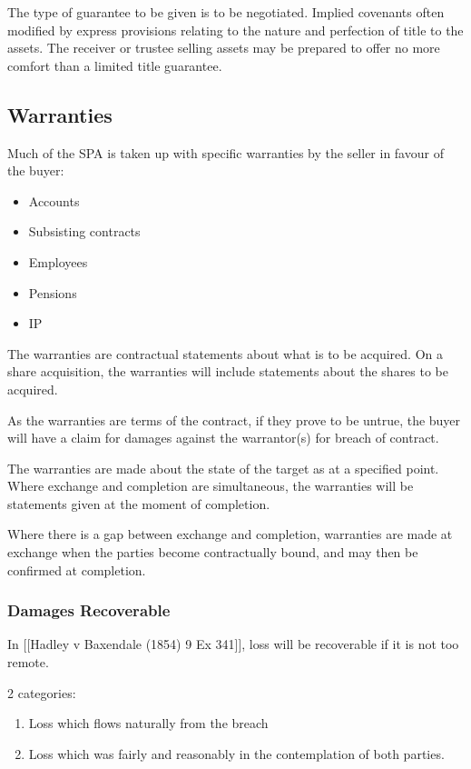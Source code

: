 \documentclass[
]{article}
\providecommand{\tightlist}{%
  \setlength{\itemsep}{0pt}\setlength{\parskip}{0pt}}
\begin{document}
The type of guarantee to be given is to be negotiated. Implied covenants
often modified by express provisions relating to the nature and
perfection of title to the assets. The receiver or trustee selling
assets may be prepared to offer no more comfort than a limited title
guarantee.

\hypertarget{warranties}{%
\subsection{Warranties}\label{warranties}}

Much of the SPA is taken up with specific warranties by the seller in
favour of the buyer:

\begin{itemize}
\tightlist
\item
  Accounts
\item
  Subsisting contracts
\item
  Employees
\item
  Pensions
\item
  IP
\end{itemize}

The warranties are contractual statements about what is to be acquired.
On a share acquisition, the warranties will include statements about the
shares to be acquired.

As the warranties are terms of the contract, if they prove to be untrue,
the buyer will have a claim for damages against the warrantor(s) for
breach of contract.

The warranties are made about the state of the target as at a specified
point. Where exchange and completion are simultaneous, the warranties
will be statements given at the moment of completion.

Where there is a gap between exchange and completion, warranties are
made at exchange when the parties become contractually bound, and may
then be confirmed at completion.

\hypertarget{damages-recoverable}{%
\subsubsection{Damages Recoverable}\label{damages-recoverable}}

In {[}{[}Hadley v Baxendale (1854) 9 Ex 341{]}{]}, loss will be
recoverable if it is not too remote.

2 categories:

\begin{enumerate}
\def\labelenumi{\arabic{enumi}.}
\tightlist
\item
  Loss which flows naturally from the breach
\item
  Loss which was fairly and reasonably in the contemplation of both
  parties.
\end{enumerate}
\end{document}

